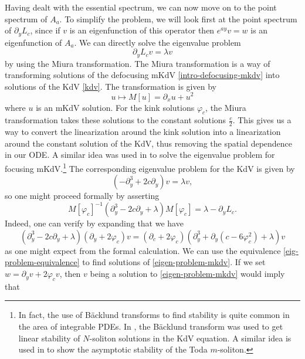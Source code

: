 Having dealt with the essential spectrum, we can now move on to the point spectrum of \(A_a\). To simplify the problem, we will look first at the point spectrum of \(\partial_y L_c\), since if \(v\) is an eigenfunction of this operator then \(e^{ay}v = w\) is an eigenfunction of \(A_a\). We can directly solve the eigenvalue problem
\begin{equation}\label{eigen-problem-mkdv}
	\partial_ yL_c v = \lambda v
\end{equation}
by using the Miura transformation. The Miura transformation is a way of transforming solutions of the defocusing mKdV \cref{intro-defocusing-mkdv} into solutions of the KdV \cref{kdv}. The transformation is given by
\begin{equation*} 
	u \mapsto M[u] = \partial_x u + u^2
\end{equation*} 
where \(u\) is an mKdV solution. For the kink solutions \(\varphi_c\), the Miura transformation takes these solutions to the constant solutions \(\frac c 2\). This gives us a way to convert the linearization around the kink solution into a linearization around the constant solution of the KdV, thus removing the spatial dependence in our ODE. A similar idea was used in \cite{pego1994asymptotic} to solve the eigenvalue problem for focusing mKdV.\footnote{In fact, the use of B\"acklund transforms to find stability is quite common in the area of integrable PDEs. In \cite{mizumachi2013asymptotic}, the B\"acklund transform was used to get linear stability of \(N\)-soliton solutions in the KdV equation. A similar idea is used in \cite{benes2012asymptotic} to show the asymptotic stability of the Toda \(m\)-soliton.} The corresponding eigenvalue problem for the KdV is given by
\begin{equation}\label{eig-problem}
	(-\partial_y^3 + 2c \partial_y) v = \lambda v,
\end{equation}
so one might proceed formally by asserting
\begin{equation*} 
	M[\varphi_c]^{-1} (\partial_y^3 - 2c \partial_y + \lambda) M[\varphi_c]  = \lambda - \partial_y L_c.
\end{equation*} 
Indeed, one can verify by expanding that we have
\begin{equation}\label{eig-problem-equivalence}
	(\partial_y^3 - 2 c \partial_y + \lambda)(\partial_y + 2\varphi_c) v = (\partial_c + 2\varphi_c)(\partial_y^3 + \partial_y(c - 6\varphi_c^2) + \lambda) v
\end{equation}
as one might expect from the formal calculation. We can use the equivalence \cref{eig-problem-equivalence} to find solutions of \cref{eigen-problem-mkdv}. If we set \(w = \partial_yv + 2\varphi_c v\), then \(v\) being a solution to \cref{eigen-problem-mkdv} would imply that
